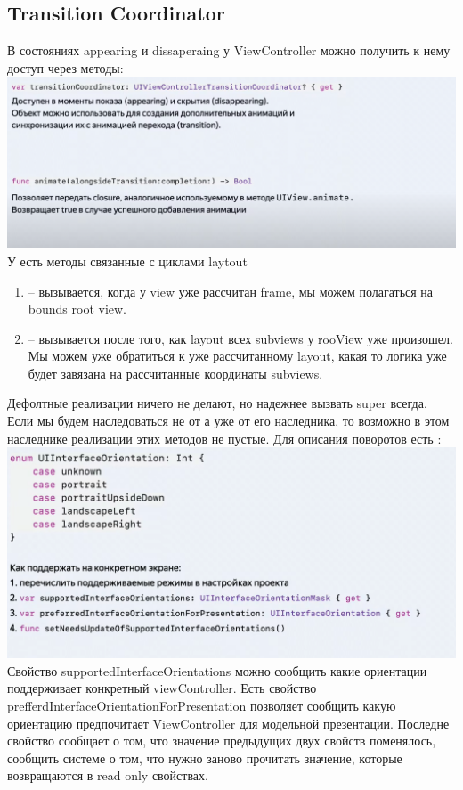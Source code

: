 \documentclass{article}
\begin{document}
    \subsection{Transition Coordinator}
    В состояниях appearing и dissaperaing у ViewController можно получить к нему доступ через методы: 
    \newline
    \includegraphics[scale = 0.3]{pic/Снимок экрана 2023-08-02 в 22.30.26.png}
    \newline
    У  есть методы связанные с циклами laytout
    \begin{enumerate}
        \item {} -- вызывается, когда у view уже рассчитан frame, мы можем полагаться на bounds root view.  
        \item {} -- вызывается после того, как layout всех subviews у rooView уже произошел. Мы можем уже обратиться к уже рассчитанному layout, какая то логика уже будет завязана на рассчитанные координаты subviews.
    \end{enumerate}
    Дефолтные реализации ничего не делают, но надежнее вызвать super всегда. Если мы будем наследоваться не от  а уже от его наследника, то возможно в этом наследнике реализации этих методов не пустые. 
    \newline
    \newline
    Для описания поворотов есть :
    \newline
    \includegraphics[scale = 0.2]{pic/Снимок экрана 2023-08-02 в 22.39.01.png}
    \newline
    Свойство supportedInterfaceOrientations можно сообщить какие ориентации поддерживает конкретный viewController. Есть свойство prefferdInterfaceOrientationForPresentation позволяет сообщить какую ориентацию предпочитает ViewController для модельной презентации. Последне свойство сообщает о том, что значение предыдущих двух свойств поменялось, сообщить системе о том, что нужно заново прочитать значение, которые возвращаются в read only свойствах. 
\end{document}
